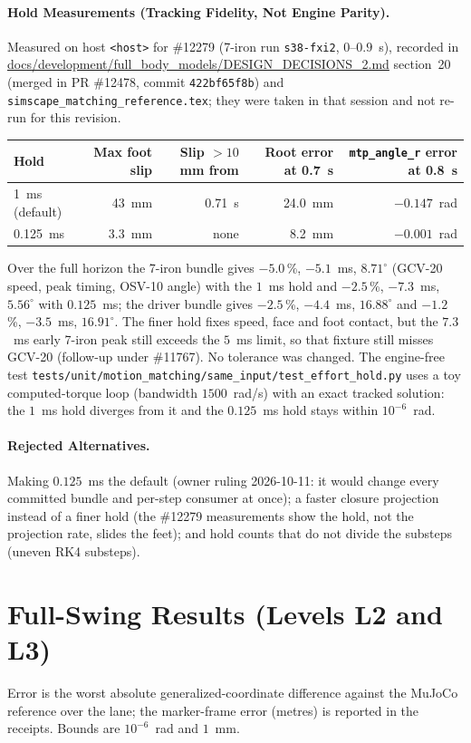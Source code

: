 \documentclass[11pt,a4paper]{article}
\begin{document}
\paragraph{Hold Measurements (Tracking Fidelity, Not Engine Parity).}
Measured on host \texttt{<host>} for \#12279 (7-iron run \texttt{s38-fxi2},
$0$--$0.9$~s), recorded in \url{docs/development/full_body_models/DESIGN_DECISIONS_2.md}
section~20 (merged in PR \#12478, commit \texttt{422bf65f8b}) and
\texttt{simscape\_matching\_reference.tex}; they were taken in
that session and not re-run for this revision.
\begin{center}\small
\begin{tabular}{lrrrr}
\toprule
Hold & Max foot slip & Slip $>10$~mm from & Root error at 0.7~s & \texttt{mtp\_angle\_r} error at 0.8~s\\
\midrule
1~ms (default) & 43~mm & 0.71~s & 24.0~mm & $-0.147$~rad\\
0.125~ms & 3.3~mm & none & 8.2~mm & $-0.001$~rad\\
\bottomrule
\end{tabular}
\end{center}
Over the full horizon the 7-iron bundle gives $-5.0$\,\%, $-5.1$~ms, $8.71^\circ$
(GCV-20 speed, peak timing, OSV-10 angle) with the $1$~ms hold and
$-2.5$\,\%, $-7.3$~ms, $5.56^\circ$ with $0.125$~ms; the driver bundle gives
$-2.5$\,\%, $-4.4$~ms, $16.88^\circ$ and $-1.2$\,\%, $-3.5$~ms, $16.91^\circ$.
The finer hold fixes speed, face and foot contact, but the $7.3$~ms early
7-iron peak still exceeds the $5$~ms limit, so that fixture still misses
GCV-20 (follow-up under \#11767).  No tolerance was changed.  The engine-free
test \texttt{tests/unit/motion\_matching/same\_input/test\_effort\_hold.py}
uses a toy computed-torque loop (bandwidth $1500$~rad/s) with an exact
tracked solution: the $1$~ms hold diverges from it and the $0.125$~ms hold
stays within $10^{-6}$~rad.

\paragraph{Rejected Alternatives.}  Making $0.125$~ms the default (owner
ruling 2026-10-11: it would change every committed bundle and per-step
consumer at once); a faster closure projection instead of a finer hold (the
\#12279 measurements show the hold, not the projection rate, slides the feet);
and hold counts that do not divide the substeps (uneven RK4 substeps).

\section{Full-Swing Results (Levels L2 and L3)}\label{sec:fullswing}
Error is the worst absolute generalized-coordinate difference against the
MuJoCo reference over the lane; the marker-frame error (metres) is reported in
the receipts.  Bounds are $10^{-6}$~rad and $1$~mm.
\end{document}
